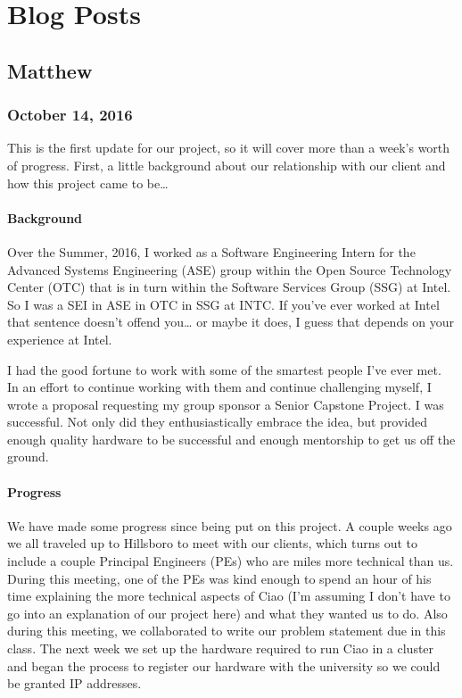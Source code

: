 \documentclass[10pt,onecolumn,journal,draftclsnofoot]{IEEEtran}
\begin{document}
\section{Blog Posts}
\subsection{Matthew}
\subsubsection{October 14, 2016}

This is the first update for our project, so it will cover more than a
week's worth of progress. First, a little background about our
relationship with our client and how this project came to be\ldots{}

\paragraph{Background} 

Over the Summer, 2016, I worked as a Software Engineering Intern for the
Advanced Systems Engineering (ASE) group within the Open Source
Technology Center (OTC) that is in turn within the Software Services
Group (SSG) at Intel. So I was a SEI in ASE in OTC in SSG at INTC. If
you've ever worked at Intel that sentence doesn't offend you\ldots{} or
maybe it does, I guess that depends on your experience at Intel.

I had the good fortune to work with some of the smartest people I've
ever met. In an effort to continue working with them and continue
challenging myself, I wrote a proposal requesting my group sponsor a
Senior Capstone Project. I was successful. Not only did they
enthusiastically embrace the idea, but provided enough quality hardware
to be successful and enough mentorship to get us off the ground.

\paragraph{Progress} 

We have made some progress since being put on this project. A couple
weeks ago we all traveled up to Hillsboro to meet with our clients,
which turns out to include a couple Principal Engineers (PEs) who are
miles more technical than us. During this meeting, one of the PEs was
kind enough to spend an hour of his time explaining the more technical
aspects of Ciao (I'm assuming I don't have to go into an explanation of
our project here) and what they wanted us to do. Also during this
meeting, we collaborated to write our problem statement due in this
class. The next week we set up the hardware required to run Ciao in a
cluster and began the process to register our hardware with the
university so we could be granted IP addresses.
\end{document}
